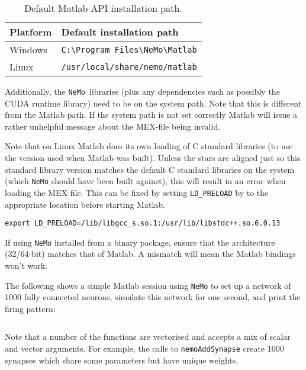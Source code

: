 \documentclass[a4paper]{article}
\newenvironment{mintframe}
  {\begin{mdframed}[linecolor=black, topline=true, bottomline=true,
    leftline=false, rightline=false, backgroundcolor=yellow!13!white,
    nobreak=true]
  }{
  \end{mdframed}
}
\newcommand{\nemo}{\texttt{NeMo}\xspace}
\newcommand{\code}[1]{\texttt{#1}}
\newcommand{\file}[1]{\texttt{#1}}
\newcommand{\cpp}{C\nolinebreak\hspace{-.05em}\raisebox{.4ex}{\tiny\bf +}\nolinebreak\hspace{-.10em}\raisebox{.4ex}{\tiny\bf +}\xspace}
\begin{document}
\begin{table}[!hb]
	\centering
	\begin{tabular}{ll}
		Platform & Default installation path \\
		\hline
		Windows & \file{C:\textbackslash Program Files\textbackslash NeMo\textbackslash Matlab} \\
		Linux & \file{/usr/local/share/nemo/matlab} \\
		\hline
	\end{tabular}
	\caption{Default Matlab API installation path.}
	\label{tab:matlab-path}
\end{table}

Additionally, the \nemo\ libraries (plus any dependencies such as possibly the
CUDA runtime library) need to be on the system path. Note that this is
different from the Matlab path. If the system path is not set correctly Matlab
will issue a rather unhelpful message about the MEX-file being invalid.

Note that on Linux Matlab does its own loading of \cpp standard libraries (to
use the version used when Matlab was built). Unless the stars are aligned just
so this standard library version matches the default \cpp standard libraries on
the system (which \nemo should have been built against), this will result in an
error when loading the MEX file. This can be fixed by setting
\code{LD\_PRELOAD} by to the appropriate location before starting Matlab.

\begin{verbatim}
export LD_PRELOAD=/lib/libgcc_s.so.1:/usr/lib/libstdc++.so.6.0.13
\end{verbatim}

If using \nemo installed from a binary package, ensure that the architecture
(32/64-bit) matches that of Matlab. A mismatch will mean the Matlab bindings
won't work.

The following shows a simple Matlab session using \nemo to set up a network of
1000 fully connected neurons, simulate this network for one second, and print
the firing pattern:

\begin{mintframe}
\inputminted{matlab}{example.m}
\end{mintframe}

Note that a number of the functions are vectorised and accepts a mix of scalar
and vector arguments. For example, the calls to \code{nemoAddSynapse} create
1000 synapses which share some parameters but have unique weights.
\end{document}
